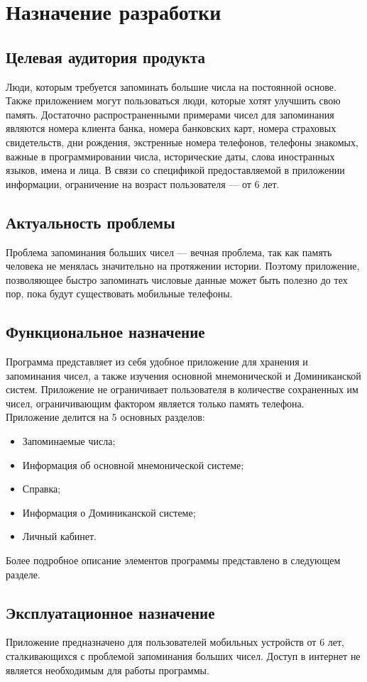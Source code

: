 \documentclass[draft]{article}
\begin{document}
\section {Назначение разработки}
\subsection{Целевая аудитория продукта}
Люди, которым требуется запоминать большие числа на постоянной основе. Также приложением могут пользоваться люди, которые хотят улучшить свою память. Достаточно распространенными примерами чисел для запоминания являются номера клиента банка, номера банковских карт, номера страховых свидетельств, дни рождения, экстренные номера телефонов, телефоны знакомых, важные в программировании числа, исторические даты, слова иностранных языков, имена и лица. В связи со спецификой предоставляемой в приложении информации, ограничение на возраст пользователя — от 6 лет.
\subsection{Актуальность проблемы}
Проблема запоминания больших чисел — вечная проблема, так как память человека не менялась значительно на протяжении истории. Поэтому приложение, позволяющее быстро запоминать числовые данные может быть полезно до тех пор, пока будут существовать мобильные телефоны.
\subsection{Функциональное назначение}
Программа представляет из себя удобное приложение для хранения и запоминания чисел, а также изучения основной мнемонической и Доминиканской систем. Приложение не ограничивает пользователя в количестве сохраненных им чисел, ограничивающим фактором является только память телефона.\\
Приложение делится на 5 основных разделов:
\begin{itemize}
\item Запоминаемые числа;
\item Информация об основной мнемонической системе;
\item Справка;
\item Информация о Доминиканской системе;
\item Личный кабинет.
\end{itemize}
Более подробное описание элементов программы представлено в следующем разделе.
\subsection{Эксплуатационное назначение}
Приложение предназначено для пользователей мобильных устройств от 6 лет, сталкивающихся с проблемой запоминания больших чисел. Доступ в интернет не является необходимым для работы программы.
~\\
\end{document}
